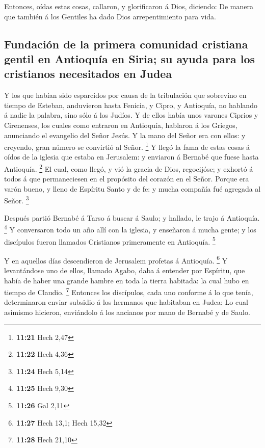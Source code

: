  Entonces, oídas estas cosas, callaron, y glorificaron á
Dios, diciendo: De manera que también á los Gentiles ha dado Dios
arrepentimiento para vida.

\hypertarget{fundaciuxf3n-de-la-primera-comunidad-cristiana-gentil-en-antioquuxeda-en-siria-su-ayuda-para-los-cristianos-necesitados-en-judea}{%
\subsection{Fundación de la primera comunidad cristiana gentil en
Antioquía en Siria; su ayuda para los cristianos necesitados en
Judea}\label{fundaciuxf3n-de-la-primera-comunidad-cristiana-gentil-en-antioquuxeda-en-siria-su-ayuda-para-los-cristianos-necesitados-en-judea}}

 Y los que habían sido esparcidos por causa de la
tribulación que sobrevino en tiempo de Esteban, anduvieron hasta
Fenicia, y Cipro, y Antioquía, no hablando á nadie la palabra, sino sólo
á los Judíos.  Y de ellos había unos varones Ciprios y
Cirenenses, los cuales como entraron en Antioquía, hablaron á los
Griegos, anunciando el evangelio del Señor Jesús.  Y la
mano del Señor era con ellos: y creyendo, gran número se convirtió al
Señor. \footnote{\textbf{11:21} Hech 2,47}  Y llegó la fama
de estas cosas á oídos de la iglesia que estaba en Jerusalem: y enviaron
á Bernabé que fuese hasta Antioquía. \footnote{\textbf{11:22} Hech 4,36}
 El cual, como llegó, y vió la gracia de Dios, regocijóse;
y exhortó á todos á que permaneciesen en el propósito del corazón en el
Señor.  Porque era varón bueno, y lleno de Espíritu Santo y
de fe: y mucha compañía fué agregada al Señor. \footnote{\textbf{11:24}
  Hech 5,14}

 Después partió Bernabé á Tarso á buscar á Saulo; y
hallado, le trajo á Antioquía. \footnote{\textbf{11:25} Hech 9,30}
 Y conversaron todo un año allí con la iglesia, y enseñaron
á mucha gente; y los discípulos fueron llamados Cristianos primeramente
en Antioquía. \footnote{\textbf{11:26} Gal 2,11}

 Y en aquellos días descendieron de Jerusalem profetas á
Antioquía. \footnote{\textbf{11:27} Hech 13,1; Hech 15,32} 
Y levantándose uno de ellos, llamado Agabo, daba á entender por
Espíritu, que había de haber una grande hambre en toda la tierra
habitada: la cual hubo en tiempo de Claudio. \footnote{\textbf{11:28}
  Hech 21,10}  Entonces los discípulos, cada uno conforme á
lo que tenía, determinaron enviar subsidio á los hermanos que habitaban
en Judea:  Lo cual asimismo hicieron, enviándolo á los
ancianos por mano de Bernabé y de Saulo.

